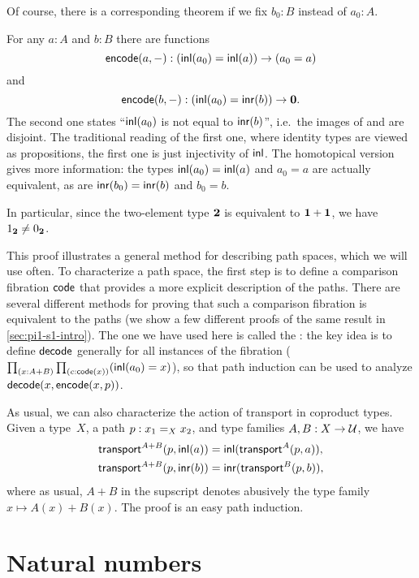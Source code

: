 \noindent
Of course, there is a corresponding theorem if we fix $b_0:B$ instead of $a_0:A$.

For any $a : A$ and $b : B$ there are functions
%
\[ \encode(a, {-}) : (\inl(a_0)=\inl(a)) \to (a_0=a)\]
%
and
%
\[ \encode(b, {-}) : (\inl(a_0)=\inr(b)) \to \emptyt. \]
%
The second one states
``$\inl(a_0)$ is not equal to $\inr(b)$'', i.e.\ the images of \inl and \inr are disjoint. The traditional reading of the first one, where identity types are viewed as propositions, the first one is just injectivity of $\inl$.  The
homotopical version gives more information: the types $\inl(a_0)=\inl(a)$ and
$a_0=a$ are actually equivalent, as are $\inr(b_0)=\inr(b)$ and $b_0=b$.

\begin{rmk}\label{rmk:true-neq-false}
In particular, since the two-element type $\bool$ is equivalent to $\unit+\unit$, we have $\btrue\neq\bfalse$.
\end{rmk}

This proof illustrates a general method for describing path spaces, which we will use often.  To characterize a path space, the first step is to define a comparison fibration $\code$ that provides a more explicit description of the paths.  There are several different methods for proving that such a comparison fibration is equivalent to the paths (we show a few different proofs of the same result in \autoref{sec:pi1-s1-intro}).  The one we have used here is called the :
the key idea is to define $\decode$ generally for all instances of the fibration ($\prd{x:A+B}{c:\code(x)} (\inl(a_0)=x)$), so that path induction can be used to analyze $\decode(x,\encode(x,p))$.  

As usual, we can also characterize the action of transport in coproduct types.
Given a type~$X$, a path $p:\id[X]{x_1}{x_2}$, and type families $A,B:X\to\type$, we have
\begin{align*}
  \transfib{A+B}{p}{\inl(a)} &= \inl (\transfib{A}{p}{a}),\\
  \transfib{A+B}{p}{\inr(b)} &= \inr (\transfib{B}{p}{b}),
\end{align*}
where as usual, $A+B$ in the supscript denotes abusively the type family $x\mapsto A(x)+B(x)$.
The proof is an easy path induction.


\section{Natural numbers}
\label{sec:compute-nat}

